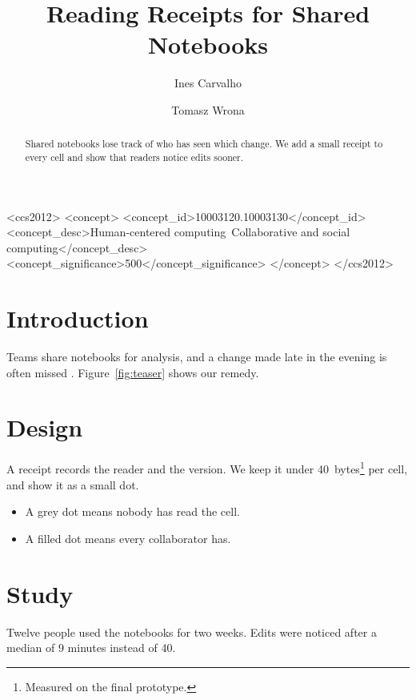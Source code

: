 \documentclass[sigconf,nonacm]{acmart}
\begin{document}
\title{Reading Receipts for Shared Notebooks}

\author{Ines Carvalho}

\author{Tomasz Wrona}

\begin{abstract}
Shared notebooks lose track of who has seen which change. We add a small
receipt to every cell and show that readers notice edits sooner.
\end{abstract}

\begin{CCSXML}
<ccs2012>
 <concept>
  <concept_id>10003120.10003130</concept_id>
  <concept_desc>Human-centered computing~Collaborative and social computing</concept_desc>
  <concept_significance>500</concept_significance>
 </concept>
</ccs2012>
\end{CCSXML}



\begin{teaserfigure}
  \centering
  \caption{Each cell shows who has read its latest version.}
  \label{fig:teaser}
\end{teaserfigure}

\maketitle

\section{Introduction}
Teams share notebooks for analysis, and a change made late in the evening is
often missed \cite{prieto20}. Figure~\ref{fig:teaser} shows our remedy.

\section{Design}
A receipt records the reader and the version. We keep it under
40~bytes\footnote{Measured on the final prototype.} per cell, and show it
as a small dot.

\begin{itemize}
  \item A grey dot means nobody has read the cell.
  \item A filled dot means every collaborator has.
\end{itemize}

\section{Study}
Twelve people used the notebooks for two weeks. Edits were noticed after a median
of 9 minutes instead of 40.



\end{document}
